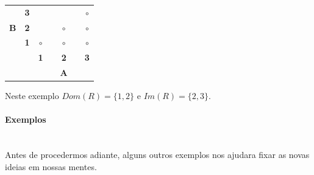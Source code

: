 \begin{table}[h]
\centering
\begin{tabular}{ccccccc}
\multicolumn{1}{c}{       } &  \multicolumn{1}{c|}{{\bf 3}} & \frame{$\circ$} & \quad& \frame{$\circ$} &\quad & $\circ$  \\
\multicolumn{1}{c}{{\bf B}} &  \multicolumn{1}{c|}{{\bf 2}} & \frame{$\circ$} & \quad& $\circ$         &\quad & $\circ$  \\
\multicolumn{1}{c}{       } &  \multicolumn{1}{c|}{{\bf 1}} & $\circ$         & \quad& $\circ$         &\quad & $\circ$  \\\cline{3-7}
                            &                               & {\bf 1} & \quad& {\bf 2} &\quad & {\bf 3}   \\
                            &                               &         & \quad& {\bf A} &\quad &           \\
\end{tabular}
\end{table}
Neste exemplo $Dom(R)=\{1,2\}$ e $Im(R)=\{2,3\}$.

\paragraph{{\bf Exemplos}}
\quad\\[0.3cm]
Antes de procedermos adiante, alguns outros exemplos nos ajudar\ao a fixar as novas ideias em nossas mentes.

